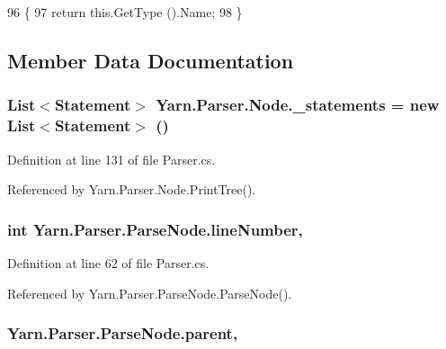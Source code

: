 \begin{DoxyCode}
96             \{
97                 \textcolor{keywordflow}{return} this.GetType ().Name;
98             \}
\end{DoxyCode}


\subsection{Member Data Documentation}
\hypertarget{a00140_ae910a20906be9b1964499efaefa48274}{
\subsubsection[{\-\_\-statements}]{\setlength{\rightskip}{0pt plus 5cm}List$<${\bf Statement}$>$ Yarn.\-Parser.\-Node.\-\_\-statements = new List$<${\bf Statement}$>$ ()\hspace{0.3cm}{\ttfamily [private]}}}\label{a00140_ae910a20906be9b1964499efaefa48274}


Definition at line 131 of file Parser.\-cs.



Referenced by Yarn.\-Parser.\-Node.\-Print\-Tree().

\hypertarget{a00150_a18b493382de0fde5b4299c1bd2250075}{
\subsubsection[{line\-Number}]{\setlength{\rightskip}{0pt plus 5cm}int Yarn.\-Parser.\-Parse\-Node.\-line\-Number\hspace{0.3cm}{\ttfamily [package]}, {\ttfamily [inherited]}}}\label{a00150_a18b493382de0fde5b4299c1bd2250075}


Definition at line 62 of file Parser.\-cs.



Referenced by Yarn.\-Parser.\-Parse\-Node.\-Parse\-Node().

\hypertarget{a00150_af313a82103fcc2ff5a177dbb06b92f7b}{
\subsubsection[{parent}]{ Yarn.\-Parser.\-Parse\-Node.\-parent\hspace{0.3cm}{\ttfamily [package]}, {\ttfamily [inherited]}}}\label{a00150_af313a82103fcc2ff5a177dbb06b92f7b}


